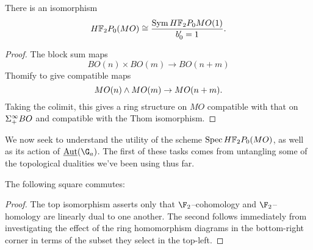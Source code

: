 \begin{corollary}\label{HF2MOisFree}
There is an isomorphism \[\HFtwo P_0(MO) \cong \frac{\Sym \HFtwo P_0 MO(1)}{b'_0 = 1}.\]
\end{corollary}
\begin{proof}
The block sum maps \[BO(n) \times BO(m) \to BO(n+m)\] Thomify to give compatible maps \[MO(n) \wedge MO(m) \to MO(n+m).\]  Taking the colimit, this gives a ring structure on $MO$ compatible with that on $\Sigma^\infty_+ BO$ and compatible with the Thom isomorphism.
\end{proof}

We now seek to understand the utility of the scheme $\Spec \HFtwo P_0(MO)$, as well as its action of $\InternalAut(\G_a)$.  The first of these tasks comes from untangling some of the topological dualities we've been using thus far.
\begin{lemma}\label{DetectingMORingMapsInHomotopy}
The following square commutes:
\begin{center}
\end{center}
\end{lemma}
\begin{proof}
The top isomorphism asserts only that $\F_2$--cohomology and $\F_2$--homology are linearly dual to one another.  The second follows immediately from investigating the effect of the ring homomorphism diagrams in the bottom-right corner in terms of the subset they select in the top-left.
\end{proof}

